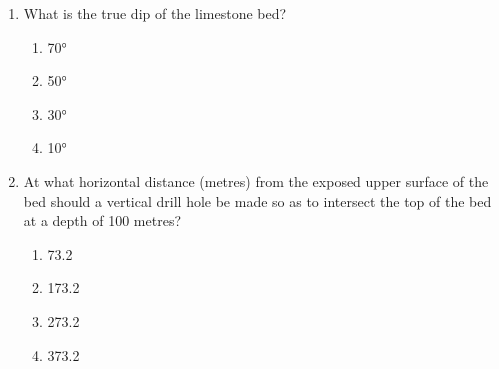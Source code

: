 \documentclass[journal,12pt,onecolumn]{IEEEtran}
\theoremstyle{remark}
\begin{document}
\begin{enumerate}[resume]


\item  What is the true dip of the limestone bed?

\begin{multicols}{4}
\begin{enumerate}
\item 70°  
\item 50°  
\item 30°  
\item 10°  
\end{enumerate}
\end{multicols}
\vspace{0.5cm}

\item At what horizontal distance (metres) from the exposed upper surface of the bed should a vertical drill hole be made so as to intersect the top of the bed at a depth of 100 metres?

\begin{multicols}{4}
\begin{enumerate}
\item 73.2  
\item 173.2  
\item 273.2  
\item 373.2  
\end{enumerate}
\end{multicols}
\vspace{0.5cm}

\end{enumerate}
\end{document}
